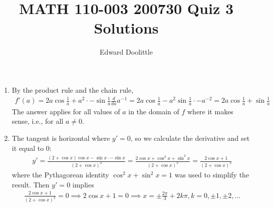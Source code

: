 \documentclass[12pt]{article}
\title{MATH 110-003 200730 Quiz 3 Solutions}
\author{Edward Doolittle}
\begin{document}
\maketitle

\begin{enumerate}
\item By the product rule and the chain rule,
  \begin{align*}
    f'(a) = 2a \cos \frac{1}{a} 
      + a^2 \cdot -\sin \frac{1}{a} \frac{d}{da} a^{-1}
      = 2a \cos \frac{1}{a} - a^2 \sin \frac{1}{a} \cdot -a^{-2}
      = 2a \cos \frac{1}{a} + \sin \frac{1}{a}
  \end{align*}
  The answer applies for all values of $a$ in the domain of $f$ where it
  makes sense, i.e., for all $a\ne 0$.
\item The tangent is horizontal where $y'=0$, so we calculate the
  derivative and set it equal to $0$:
  \begin{align*}
    y' = \frac{(2+\cos x)\cos x - \sin x \cdot -\sin x}{(2+\cos x)^2}
    = \frac{2\cos x + \cos^2 x + \sin^2 x}{(2+\cos x)^2}
    = \frac{2\cos x + 1}{(2+\cos x)^2}
  \end{align*}
  where the Pythagorean identity $\cos^2 x + \sin^2 x = 1$ was used to
  simplify the result.  Then $y'=0$ implies
  \begin{align*}
    \frac{2\cos x + 1}{(2+\cos x)^2} = 0
    \implies 2\cos x + 1 = 0
    \implies x = \pm \frac{2\pi}{3} + 2k\pi, k=0, \pm 1, \pm 2, \ldots
  \end{align*}
\end{enumerate}
\end{document}
